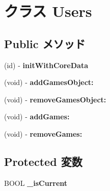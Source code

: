 \hypertarget{interface_users}{
\section{クラス Users}
\label{interface_users}
}
\subsection*{Public メソッド}
\begin{DoxyCompactItemize}
\item 
\hypertarget{interface_users_a14e66b84d58de27a2b53b87adce8d0e5}{
(id) -\/ {\bfseries initWithCoreData}}
\label{interface_users_a14e66b84d58de27a2b53b87adce8d0e5}

\item 
\hypertarget{interface_users_a9e60f26bc975d9867dfb48b44a9d1a27}{
(void) -\/ {\bfseries addGamesObject:}}
\label{interface_users_a9e60f26bc975d9867dfb48b44a9d1a27}

\item 
\hypertarget{interface_users_a7a1b1e37f674755055ce137a77b7ad21}{
(void) -\/ {\bfseries removeGamesObject:}}
\label{interface_users_a7a1b1e37f674755055ce137a77b7ad21}

\item 
\hypertarget{interface_users_a447de9f95daae7143c9decf6aa0cd159}{
(void) -\/ {\bfseries addGames:}}
\label{interface_users_a447de9f95daae7143c9decf6aa0cd159}

\item 
\hypertarget{interface_users_aa0bacfe5f2200d9798330841018ff106}{
(void) -\/ {\bfseries removeGames:}}
\label{interface_users_aa0bacfe5f2200d9798330841018ff106}

\end{DoxyCompactItemize}
\subsection*{Protected 変数}
\begin{DoxyCompactItemize}
\item 
\hypertarget{interface_users_a683b6da65c97e311091174c077faf311}{
BOOL {\bfseries \_\-isCurrent}}
\label{interface_users_a683b6da65c97e311091174c077faf311}

\end{DoxyCompactItemize}
